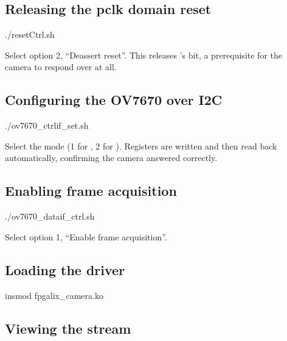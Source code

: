 \subsection{Releasing the pclk domain reset}
\label{subsec:fpgalix-camera-root}

\begin{shellcodeboard}
./resetCtrl.sh
\end{shellcodeboard}

Select option 2, ``Deassert reset''. This releases 's  bit, a prerequisite for the camera to respond over  at all.

\subsection{Configuring the OV7670 over I2C}
\label{subsec:fpgalix-camera-i2c-config}

\begin{shellcodeboard}
./ov7670_ctrlif_set.sh
\end{shellcodeboard}

Select the  mode (1 for , 2 for ). Registers are written and then read back automatically, confirming the camera answered correctly.

\subsection{Enabling frame acquisition}
\label{subsec:fpgalix-camera-frame-acq}

\begin{shellcodeboard}
./ov7670_dataif_ctrl.sh
\end{shellcodeboard}

Select option 1, ``Enable frame acquisition''.

\subsection{Loading the driver}
\label{subsec:fpgalix-camera-load}

\begin{shellcodeboard}
insmod fpgalix_camera.ko
\end{shellcodeboard}

\subsection{Viewing the stream}
\label{subsec:fpgalix-camera-viewing}

